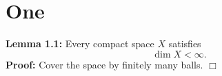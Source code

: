 \documentclass{article}
\begin{document}
\section{One}

{\bf Lemma 1.1:} Every compact space $X$ satisfies
\[
  \dim X < \infty.
\]
{\bf Proof:} Cover the space by finitely many balls. $\Box$
\end{document}
